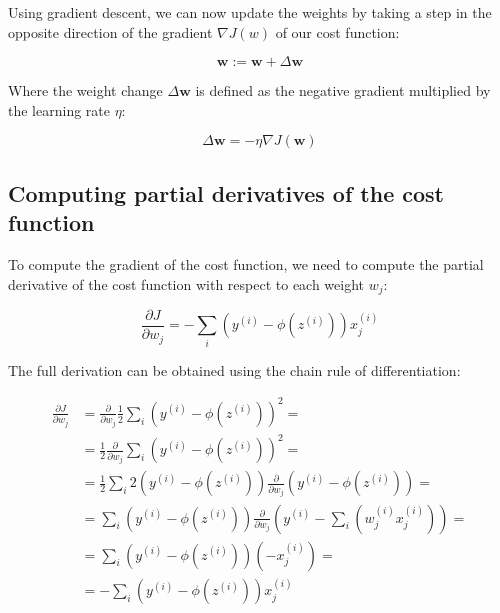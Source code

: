 \documentclass[11pt]{article}
\newcommand{\vect}[1]{\boldsymbol{#1}}
\newcommand{\pa}[1]{\partial{#1}}
\begin{document}
    Using gradient descent, we can now update the weights by taking a step in the opposite direction of the gradient $\nabla J(w)$ of our cost function:

    \begin{equation}
        \label{eq:weight_update}
        \vect{w} := \vect{w} + \Delta \vect{w}
    \end{equation}

    Where the weight change $\Delta \vect{w}$ is defined as the negative gradient multiplied by the learning rate $\eta$:

    \begin{equation}
        \label{eq:delta_w}
        \Delta \vect{w} = - \eta \nabla J (\vect{w})
    \end{equation}

    \subsection{Computing partial derivatives of the cost function} \label{subsec:ada_grad_pd}

    To compute the gradient of the cost function, we need to compute the partial derivative of the cost function with respect to each weight $w_j$:

    \begin{equation}
        \label{eq:dJ_dw}
        \frac{ \pa{J} } { \pa{w_j} } = - \sum \limits_i \left( y^{(i)} - \phi \left( z^{(i)} \right) \right) x_j^{(i)}
    \end{equation}

    The full derivation can be obtained using the chain rule of differentiation:

    \begin{equation}
        \begin{split}
            \frac{ \pa{J} } { \pa{w_j} } & =
            \frac{\partial} {\pa{w_j}} \frac{1} {2} \sum \limits_i \left( y^{(i)} - \phi \left( z^{(i)} \right) \right) ^2 = \\
            & = \frac{1} {2} \frac{\partial} {\pa{w_j}} \sum \limits_i \left( y^{(i)} - \phi \left( z^{(i)} \right) \right) ^2 = \\
            & = \frac{1} {2} \sum \limits_i 2 \left( y^{(i)} - \phi \left( z^{(i)} \right) \right) \frac{\partial} {\pa{w_j}} \left( y^{(i)} - \phi \left( z^{(i)} \right) \right) = \\
            & = \sum \limits_i \left( y^{(i)} - \phi \left( z^{(i)} \right) \right) \frac{\partial} {\pa{w_j}} \left( y^{(i)} - \sum \limits_i \left( w_j^{(i)} x_j^{(i)} \right) \right) = \\
            & = \sum \limits_i \left( y^{(i)} - \phi \left( z^{(i)} \right) \right) \left( - x_j^{(i)} \right) = \\
            & = -\sum \limits_i \left( y^{(i)} - \phi \left( z^{(i)} \right) \right) x_j^{(i)}
        \end{split}
    \end{equation}
\end{document}
